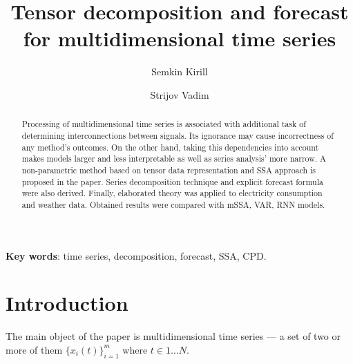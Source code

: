 
\usepackage[backend=biber, sorting=none]{biblatex}
\usepackage{subfigure}
\usepackage{authblk}



\theoremstyle{definition}
\newtheorem*{Def}{Definition}
\theoremstyle{plain}
\newtheorem{Lem}{Lemma}
\newtheorem{Th}{Theorem}

\newcommand{\delayV}[1]{\overset{\leftarrow}{\mathbf{x}}_{#1}}
\newcommand{\delayM}[1]{\overset{\leftarrow}{\mathbf{X}}_{#1}}

\title{Tensor decomposition and forecast for multidimensional time series}

\author[1]{Semkin Kirill}
\author[2]{Strijov Vadim}


\date{}


	
	\maketitle
	
	\begin{abstract}
		
		Processing of multidimensional time series is associated with additional task of determining interconnections between signals. Its ignorance may cause incorrectness of any method's outcomes. On the other hand, taking this dependencies into account makes models larger and less interpretable as well as series analysis' more narrow. A non-parametric method based on tensor data representation and SSA approach is proposed in the paper. Series decomposition technique and explicit forecast formula were also derived. Finally, elaborated theory was applied to electricity consumption and weather data. Obtained results were compared with mSSA, VAR, RNN models.
		
	\end{abstract}
	
	\textbf{Key words}: {\small time series, decomposition, forecast, SSA, CPD}.
	
	\section{Introduction}\label{Intro}
	
	The main object of the paper is multidimensional time series --- a set of two or more of them $ \{x_i(t)\}_{i=1}^m $ where $ t \in 1 \ldots N $. %
	
